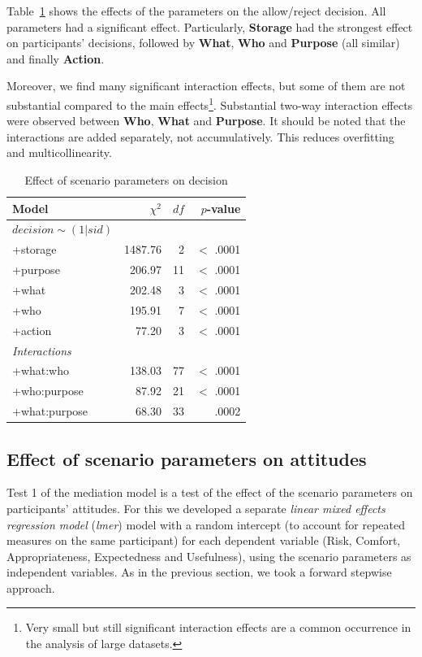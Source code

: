 Table~\ref{tab:para_decision} shows the effects of the parameters on the allow/reject decision. All parameters had a significant effect. Particularly, \textbf{Storage} had the strongest effect on participants' decisions, followed by \textbf{What}, \textbf{Who} and \textbf{Purpose} (all similar) and finally \textbf{Action}.

Moreover, we find many significant interaction effects, but some of them are not substantial compared to the main effects\footnote{Very small but still significant interaction effects are a common occurrence in the analysis of large datasets.}. Substantial two-way interaction effects were observed between \textbf{Who}, \textbf{What} and \textbf{Purpose}. It should be noted that the interactions are added separately, not accumulatively. This reduces overfitting and multicollinearity.

\begin{table}
	\centering
	\caption{Effect of scenario parameters on decision}
	\label{tab:para_decision}
	\begin{tabular}{ l | r | r | r }
		\hline
		Model &	$\chi^2$ & $df$ & $p$-value 	\\ \hline
		$decision\sim(1 | sid)$ &		  	&	    &				\\
		+storage &					1487.76	& 	  2 & 		$<$ .0001 	\\
		+purpose &					206.97 &		  11 &		$<$ .0001 	\\
		+what &				202.48 & 	  3 & 		  	$<$ .0001	\\
		+who &			195.91 &		  7 & 		$<$ .0001 	\\
		+action &			77.20 &		  3 & 		$<$ .0001\\\hline
		\emph{Interactions}&			 &		  & \\\hline
		+what:who &			138.03 &		  77 & 		$<$ .0001\\
		+who:purpose &			87.92 &		  21 & 		$<$ .0001\\
		+what:purpose &			68.30 &		  33 & 		.0002\\
		\hline
	\end{tabular}
\end{table}

\subsection{Effect of scenario parameters on attitudes}
Test 1 of the mediation model is a test of the effect of the scenario parameters on participants' attitudes. For this we developed a separate \emph{linear mixed effects regression model} (\emph{lmer}) model with a random intercept (to account for repeated measures on the same participant) for each dependent variable (Risk, Comfort, Appropriateness, Expectedness and Usefulness), using the scenario parameters as independent variables. As in the previous section, we took a forward stepwise approach.

